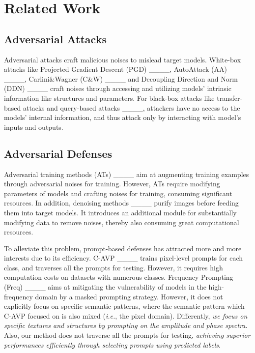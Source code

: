 \section{Related Work}
\subsection{Adversarial Attacks}
Adversarial attacks craft malicious noises to mislead target models. White-box attacks like Projected Gradient Descent (PGD) ____, AutoAttack (AA) ____, Carlini\&Wagner (C\&W) ____ and Decoupling Direction and Norm (DDN) ____ craft noises through accessing and utilizing models' intrinsic information like structures and parameters. For black-box attacks like transfer-based attacks and query-based attacks ____, attackers have no access to the models' internal information, and thus attack only by interacting with model's inputs and outputs.

\subsection{Adversarial Defenses}
Adversarial training methods (ATs) ____ aim at augmenting training examples through adversarial noises for training. However, ATs require modifying parameters of models and crafting noises for training, consuming significant resources. In addition, denoising methods ____ purify images before feeding them into target models. It introduces an additional module for substantially modifying data to remove noises, thereby also consuming great computational resources.

To alleviate this problem, prompt-based defenses has attracted more and more interests due to its efficiency. C-AVP ____ trains pixel-level prompts for each class, and traverses all the prompts for testing. However, it requires high computation costs on datasets with numerous classes. Frequency Prompting (Freq) ____ aims at mitigating the vulnerability of models in the high-frequency domain by a masked prompting strategy. However, it does not explicitly focus on specific semantic patterns, where the semantic pattern which C-AVP focused on is also mixed (\textit{i.e.}, the pixel domain). Differently, \textit{we focus on specific textures and structures by prompting on the amplitude and phase spectra}. Also, our method does not traverse all the prompts for testing, \textit{achieving superior performances efficiently through selecting prompts using predicted labels}.
